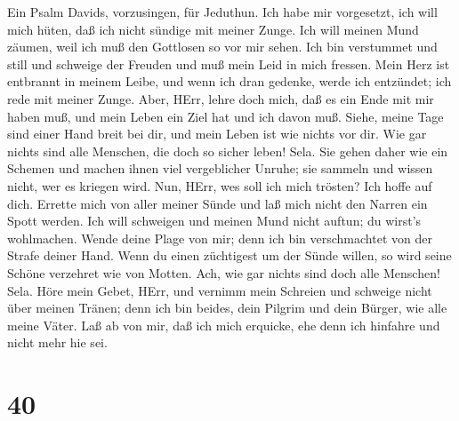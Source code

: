  Ein Psalm Davids, vorzusingen, für Jeduthun. 
Ich habe mir vorgesetzt, ich will mich hüten, daß ich nicht sündige mit
meiner Zunge. Ich will meinen Mund zäumen, weil ich muß den Gottlosen so
vor mir sehen.  Ich bin verstummet und still und schweige
der Freuden und muß mein Leid in mich fressen.  Mein Herz
ist entbrannt in meinem Leibe, und wenn ich dran gedenke, werde ich
entzündet; ich rede mit meiner Zunge.  Aber, HErr, lehre
doch mich, daß es ein Ende mit mir haben muß, und mein Leben ein Ziel
hat und ich davon muß.  Siehe, meine Tage sind einer Hand
breit bei dir, und mein Leben ist wie nichts vor dir. Wie gar nichts
sind alle Menschen, die doch so sicher leben! Sela.  Sie
gehen daher wie ein Schemen und machen ihnen viel vergeblicher Unruhe;
sie sammeln und wissen nicht, wer es kriegen wird.  Nun,
HErr, wes soll ich mich trösten? Ich hoffe auf dich. 
Errette mich von aller meiner Sünde und laß mich nicht den Narren ein
Spott werden.  Ich will schweigen und meinen Mund nicht
auftun; du wirst's wohlmachen.  Wende deine Plage von mir;
denn ich bin verschmachtet von der Strafe deiner Hand. 
Wenn du einen züchtigest um der Sünde willen, so wird seine Schöne
verzehret wie von Motten. Ach, wie gar nichts sind doch alle Menschen!
Sela.  Höre mein Gebet, HErr, und vernimm mein Schreien und
schweige nicht über meinen Tränen; denn ich bin beides, dein Pilgrim und
dein Bürger, wie alle meine Väter.  Laß ab von mir, daß ich
mich erquicke, ehe denn ich hinfahre und nicht mehr hie sei.

\hypertarget{section-39}{%
\section{40}\label{section-39}}

